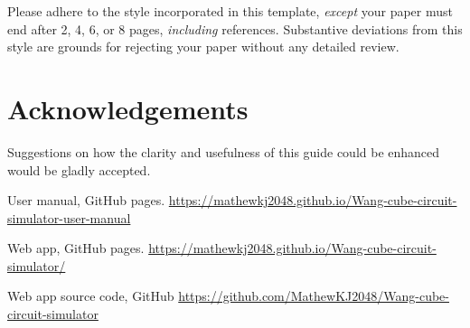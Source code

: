 \documentclass[letterpaper,11pt]{article}
\begin{document}
Please adhere to the style incorporated in this template, \emph{except} your paper
must end after 2, 4, 6, or 8 pages, \emph{including} references. Substantive
deviations from this style are grounds for rejecting your paper without
any detailed review.


\section*{Acknowledgements}

Suggestions on how the clarity and usefulness of this guide could be
enhanced would be gladly accepted.

    
{\setlength{\baselineskip}{13pt} %
\raggedright				%
\begin{thebibliography}{99}








 User manual, GitHub pages. \url{https://mathewkj2048.github.io/Wang-cube-circuit-simulator-user-manual}

 Web app, GitHub pages. \url{https://mathewkj2048.github.io/Wang-cube-circuit-simulator/}

 Web app source code, GitHub \url{https://github.com/MathewKJ2048/Wang-cube-circuit-simulator}


\end{thebibliography}}
\end{document}
